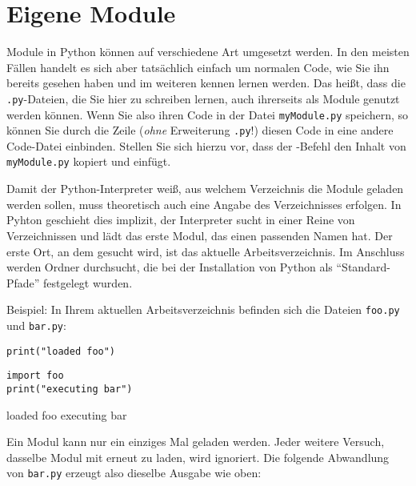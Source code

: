 \section{Eigene Module}
Module in Python können auf verschiedene Art umgesetzt werden. In den meisten Fällen handelt es sich aber tatsächlich einfach um normalen Code, wie Sie ihn bereits gesehen haben und im weiteren kennen lernen werden. Das heißt, dass die \texttt{.py}-Dateien, die Sie hier zu schreiben lernen, auch ihrerseits als Module genutzt werden können. Wenn Sie also ihren Code in der Datei \texttt{myModule.py} speichern, so können Sie durch die Zeile  (\emph{ohne} Erweiterung \texttt{.py}!) diesen Code in eine andere Code-Datei einbinden. Stellen Sie sich hierzu vor, dass der -Befehl den Inhalt von \texttt{myModule.py} kopiert und einfügt.

Damit der Python-Interpreter weiß, aus welchem Verzeichnis die Module geladen werden sollen, muss theoretisch auch eine Angabe des Verzeichnisses erfolgen. In Pyhton geschieht dies implizit, \ie der Interpreter sucht in einer Reine von Verzeichnissen und lädt das erste Modul, das einen passenden Namen hat. Der erste Ort, an dem gesucht wird, ist das aktuelle Arbeitsverzeichnis. Im Anschluss werden Ordner durchsucht, die bei der Installation von Python als \enquote{Standard-Pfade} festgelegt wurden.

Beispiel: In Ihrem aktuellen Arbeitsverzeichnis befinden sich die Dateien \texttt{foo.py} und \texttt{bar.py}:
\begin{codebox}
\begin{verbatim}
print("loaded foo")
\end{verbatim}
\end{codebox}

\begin{codebox}
\begin{verbatim}
import foo
print("executing bar")
\end{verbatim}
\end{codebox}

\begin{cmdbox}
loaded foo
executing bar
\end{cmdbox}

Ein Modul kann nur ein einziges Mal geladen werden. Jeder weitere Versuch, dasselbe Modul mit  erneut zu laden, wird ignoriert. Die folgende Abwandlung von \texttt{bar.py} erzeugt also dieselbe Ausgabe wie oben:

